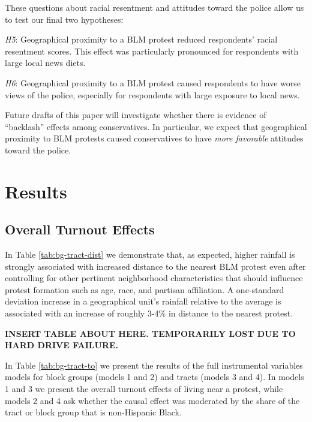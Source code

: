 \documentclass[
  12pt,
]{article}
\begin{document}
These questions about racial resentment and attitudes toward the police allow us to test our final two hypotheses:

\emph{H5}: Geographical proximity to a BLM protest reduced respondents' racial resentment scores. This effect was particularly pronounced for respondents with large local news diets.

\emph{H6}: Geographical proximity to a BLM protest caused respondents to have worse views of the police, especially for respondents with large exposure to local news.

Future drafts of this paper will investigate whether there is evidence of ``backlash'' effects among conservatives. In particular, we expect that geographical proximity to BLM protests caused conservatives to have \emph{more favorable} attitudes toward the police.

\hypertarget{results}{%
\section*{Results}\label{results}}

\hypertarget{overall-turnout-effects}{%
\subsection*{Overall Turnout Effects}\label{overall-turnout-effects}}

In Table \ref{tab:bg-tract-dist} we demonstrate that, as expected, higher rainfall is strongly associated with increased distance to the nearest BLM protest even after controlling for other pertinent neighborhood characteristics that should influence protest formation such as age, race, and partisan affiliation. A one-standard deviation increase in a geographical unit's rainfall relative to the average is associated with an increase of roughly 3-4\% in distance to the nearest protest.

\textbf{INSERT TABLE ABOUT HERE. TEMPORARILY LOST DUE TO HARD DRIVE FAILURE.}

In Table \ref{tab:bg-tract-to} we present the results of the full instrumental variables models for block groups (models 1 and 2) and tracts (models 3 and 4). In models 1 and 3 we present the overall turnout effects of living near a protest, while models 2 and 4 ask whether the causal effect was moderated by the share of the tract or block group that is non-Hispanic Black.
\end{document}
